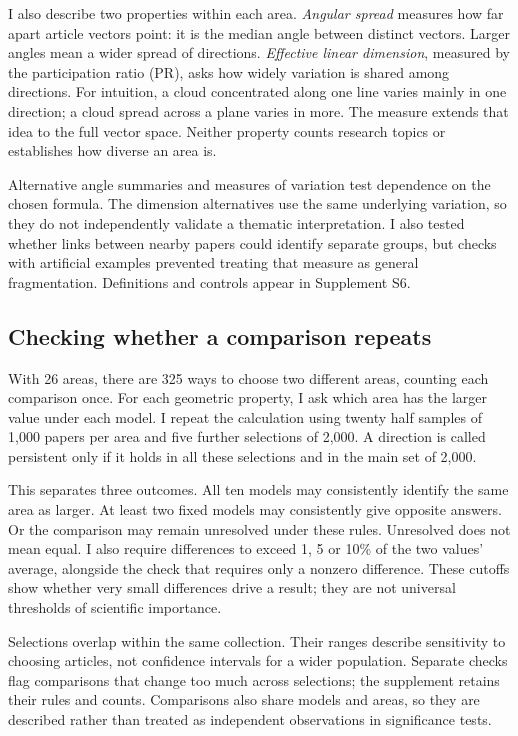\documentclass[12pt]{article}
\begin{document}
I also describe two properties within each area. \emph{Angular spread} measures how far apart article vectors point: it is the median angle between distinct vectors. Larger angles mean a wider spread of directions. \emph{Effective linear dimension}, measured by the participation ratio (PR), asks how widely variation is shared among directions. For intuition, a cloud concentrated along one line varies mainly in one direction; a cloud spread across a plane varies in more. The measure extends that idea to the full vector space. Neither property counts research topics or establishes how diverse an area is.

Alternative angle summaries and measures of variation test dependence on the chosen formula. The dimension alternatives use the same underlying variation, so they do not independently validate a thematic interpretation. I also tested whether links between nearby papers could identify separate groups, but checks with artificial examples prevented treating that measure as general fragmentation. Definitions and controls appear in Supplement S6.

\subsection{Checking whether a comparison repeats}
With 26 areas, there are 325 ways to choose two different areas, counting each comparison once. For each geometric property, I ask which area has the larger value under each model. I repeat the calculation using twenty half samples of 1,000 papers per area and five further selections of 2,000. A direction is called persistent only if it holds in all these selections and in the main set of 2,000.

This separates three outcomes. All ten models may consistently identify the same area as larger. At least two fixed models may consistently give opposite answers. Or the comparison may remain unresolved under these rules. Unresolved does not mean equal. I also require differences to exceed 1, 5 or 10\% of the two values' average, alongside the check that requires only a nonzero difference. These cutoffs show whether very small differences drive a result; they are not universal thresholds of scientific importance.

Selections overlap within the same collection. Their ranges describe sensitivity to choosing articles, not confidence intervals for a wider population. Separate checks flag comparisons that change too much across selections; the supplement retains their rules and counts. Comparisons also share models and areas, so they are described rather than treated as independent observations in significance tests.
\end{document}

